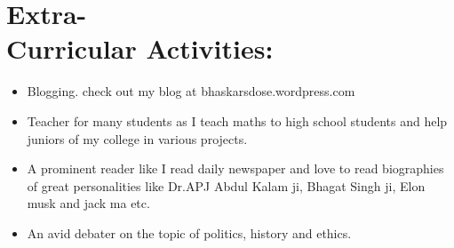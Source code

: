 \documentclass[10pt]{report}
\begin{document}
\section*{Extra-\\Curricular Activities:} %
\begin{itemize}
	\item Blogging. check out my blog at bhaskarsdose.wordpress.com
	\item Teacher for many students as I teach maths to high school students and help juniors of my college in various projects.
	\item A prominent reader like I read daily newspaper and love to read biographies of great personalities like Dr.APJ Abdul Kalam ji, Bhagat Singh ji, Elon musk and jack ma etc.
	\item An avid debater on the topic of politics, history and ethics.
\end{itemize}
\end{document}
